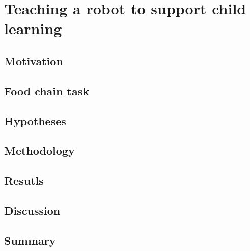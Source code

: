 \chapter{Teaching a robot to support child learning}\label{chap:education}

\section{Motivation}

\section{Food chain task}

\section{Hypotheses}

\section{Methodology}

\section{Resutls}

\section{Discussion}

\section{Summary}


